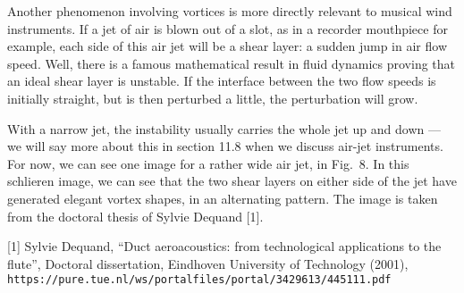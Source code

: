   Another phenomenon involving vortices is more directly relevant to musical 
  wind instruments. If a jet of air is blown out of a slot, as in a recorder 
  mouthpiece for example, each side of this air jet will be a shear layer: a 
  sudden jump in air flow speed. Well, there is a famous mathematical result in 
  fluid dynamics proving that an ideal shear layer is unstable. If the 
  interface between the two flow speeds is initially straight, but is then 
  perturbed a little, the perturbation will grow. 

  With a narrow jet, the instability usually carries the whole jet up and down 
  --- we will say more about this in section 11.8 when we discuss air-jet 
  instruments. For now, we can see one image for a rather wide air jet, in 
  Fig.\ 8. In this schlieren image, we can see that the two shear layers on 
  either side of the jet have generated elegant vortex shapes, in an 
  alternating pattern. The image is taken from the doctoral thesis of Sylvie 
  Dequand [1]. 




  \sectionreferences{}[1] Sylvie Dequand, “Duct aeroacoustics: from 
  technological applications to the flute”, Doctoral dissertation, Eindhoven 
  University of Technology (2001), 
  \tt{}https://pure.tue.nl/ws/portalfiles/portal/3429613/445111.pdf\rm{} 